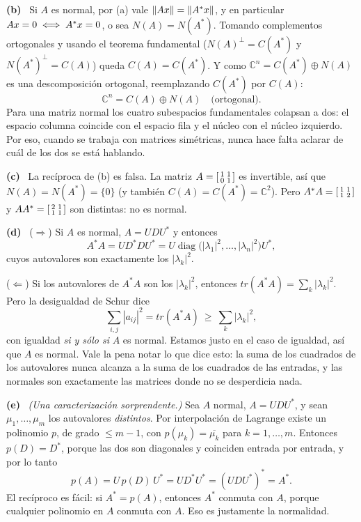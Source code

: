 \documentclass[11pt,a4paper]{article}
\newcommand{\bi}[1]{\boldsymbol{#1}}
\newcommand{\n}[1]{\boldsymbol{#1}}
\newcommand{\Cx}{\mathbb{C}}
\DeclareMathOperator{\gen}{span}
\DeclareMathOperator{\tr}{tr}
\DeclareMathOperator{\rg}{rg}
\DeclareMathOperator{\diag}{diag}
\def\n#1{#1}\def\bi#1{#1}\def\rg{rg}\def\tr{tr}\def\gen{span}%
\newcommand{\itemsol}[1]{\par\medskip\noindent\textbf{(#1)}\ \ignorespaces}
\begin{document}
\itemsol{b} Si $A$ es normal, por (a) vale $\|A\bx\|=\|A^{*}\bx\|$, y en
particular $A\bx=\n0\iff A^{*}\bx=\n0$, o sea $N(A)=N(A^{*})$. Tomando
complementos ortogonales y usando el teorema fundamental
($N(A)^{\perp}=C(A^{*})$ y $N(A^{*})^{\perp}=C(A)$) queda $C(A)=C(A^{*})$. Y como
$\Cx^n=C(A^{*})\oplus N(A)$ es una descomposición ortogonal, reemplazando
$C(A^{*})$ por $C(A)$:
\[
\Cx^{n}=C(A)\oplus N(A)\quad\text{(ortogonal).}
\]
Para una matriz normal los cuatro subespacios fundamentales colapsan a dos: el
espacio columna coincide con el espacio fila y el núcleo con el núcleo
izquierdo. Por eso, cuando se trabaja con matrices simétricas, nunca hace falta
aclarar de cuál de los dos se está hablando.

\itemsol{c} La recíproca de (b) es falsa. La matriz
$A=\begin{bsmallmatrix}1&1\\0&1\end{bsmallmatrix}$ es invertible, así que
$N(A)=N(A^{*})=\{\n0\}$ (y también $C(A)=C(A^{*})=\Cx^2$). Pero
$A^{*}A=\begin{bsmallmatrix}1&1\\1&2\end{bsmallmatrix}$ y
$AA^{*}=\begin{bsmallmatrix}2&1\\1&1\end{bsmallmatrix}$ son distintas: no es
normal.

\itemsol{d} ($\Rightarrow$) Si $A$ es normal, $A=UDU^{*}$ y entonces
\[
A^{*}A=UD^{*}DU^{*}=U\diag\big(|\lambda_1|^2,\dots,|\lambda_n|^2\big)U^{*},
\]
cuyos autovalores son exactamente los $|\lambda_k|^2$.

($\Leftarrow$) Si los autovalores de $A^{*}A$ son los $|\lambda_k|^2$, entonces
$\tr(A^{*}A)=\sum_k|\lambda_k|^2$. Pero la desigualdad de Schur dice
\[
\sum_{i,j}|a_{ij}|^{2}=\tr(A^{*}A)\ \ge\ \sum_k|\lambda_k|^{2},
\]
con igualdad \emph{si y sólo si} $A$ es normal. Estamos justo en el caso de
igualdad, así que $A$ es normal. Vale la pena notar lo que dice esto: la suma de
los cuadrados de los autovalores nunca alcanza a la suma de los cuadrados de las
entradas, y las normales son exactamente las matrices donde no se desperdicia
nada.

\itemsol{e} \emph{(Una caracterización sorprendente.)} Sea $A$ normal,
$A=UDU^{*}$, y sean $\mu_1,\dots,\mu_m$ los autovalores \emph{distintos}. Por
interpolación de Lagrange existe un polinomio $p$, de grado $\le m-1$, con
$p(\mu_k)=\overline{\mu_k}$ para $k=1,\dots,m$. Entonces $p(D)=D^{*}$, porque las
dos son diagonales y coinciden entrada por entrada, y por lo tanto
\[
p(A)=U\,p(D)\,U^{*}=UD^{*}U^{*}=(UDU^{*})^{*}=A^{*}.
\]
El recíproco es fácil: si $A^{*}=p(A)$, entonces $A^{*}$ conmuta con $A$, porque
cualquier polinomio en $A$ conmuta con $A$. Eso es justamente la normalidad.
\end{document}
